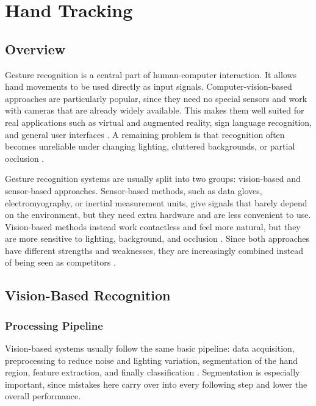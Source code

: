 \chapter{Hand Tracking}
 
\section{Overview}
Gesture recognition is a central part of human-computer interaction. It allows hand movements to be used directly as input signals. Computer-vision-based approaches are particularly popular, since they need no special sensors and work with cameras that are already widely available. This makes them well suited for real applications such as virtual and augmented reality, sign language recognition, and general user interfaces \cite{qiComputerVisionbasedHand2024, cuiDeepVisionbasedRealtime2025}. A remaining problem is that recognition often becomes unreliable under changing lighting, cluttered backgrounds, or partial occlusion \cite{qiComputerVisionbasedHand2024}.
 
Gesture recognition systems are usually split into two groups: vision-based and sensor-based approaches. Sensor-based methods, such as data gloves, electromyography, or inertial measurement units, give signals that barely depend on the environment, but they need extra hardware and are less convenient to use. Vision-based methods instead work contactless and feel more natural, but they are more sensitive to lighting, background, and occlusion \cite{qiComputerVisionbasedHand2024, shinMethodologicalStructuralReview2024}. Since both approaches have different strengths and weaknesses, they are increasingly combined instead of being seen as competitors \cite{wangComprehensiveSurveyMultimodal2026}.
 
\section{Vision-Based Recognition}
 
\subsection{Processing Pipeline}
Vision-based systems usually follow the same basic pipeline: data acquisition, preprocessing to reduce noise and lighting variation, segmentation of the hand region, feature extraction, and finally classification \cite{qiComputerVisionbasedHand2024}. Segmentation is especially important, since mistakes here carry over into every following step and lower the overall performance.
 
